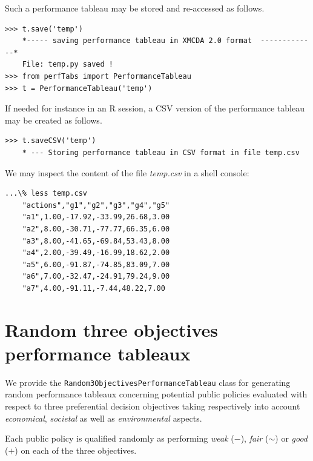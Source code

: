 Such a performance tableau may be stored and re-accessed as follows.

\begin{lstlisting}[basicstyle=\footnotesize]
>>> t.save('temp')
    *----- saving performance tableau in XMCDA 2.0 format  -------------*
    File: temp.py saved !
>>> from perfTabs import PerformanceTableau
>>> t = PerformanceTableau('temp')
\end{lstlisting}

 If needed for instance in an R session, a CSV version of the performance tableau may be created as follows.
\begin{lstlisting}
>>> t.saveCSV('temp')
    * --- Storing performance tableau in CSV format in file temp.csv
\end{lstlisting}

We may inspect the content of the file \emph{temp.csv} in a shell console:
\begin{lstlisting}
...\% less temp.csv
    "actions","g1","g2","g3","g4","g5"
    "a1",1.00,-17.92,-33.99,26.68,3.00
    "a2",8.00,-30.71,-77.77,66.35,6.00
    "a3",8.00,-41.65,-69.84,53.43,8.00
    "a4",2.00,-39.49,-16.99,18.62,2.00
    "a5",6.00,-91.87,-74.85,83.09,7.00
    "a6",7.00,-32.47,-24.91,79.24,9.00
    "a7",4.00,-91.11,-7.44,48.22,7.00
\end{lstlisting}

 \section{Random three objectives performance tableaux}
\label{sec:6.4}

We provide the \texttt{Random3ObjectivesPerformanceTableau} class for generating random performance tableaux concerning potential public policies evaluated with respect to three preferential decision objectives taking respectively into account \emph{economical}, \emph{societal} as well as \emph{environmental} aspects.

Each public policy is qualified randomly as performing \emph{weak} ($-$), \emph{fair} ($\sim$) or \emph{good} ($+$) on each of the three objectives. 


